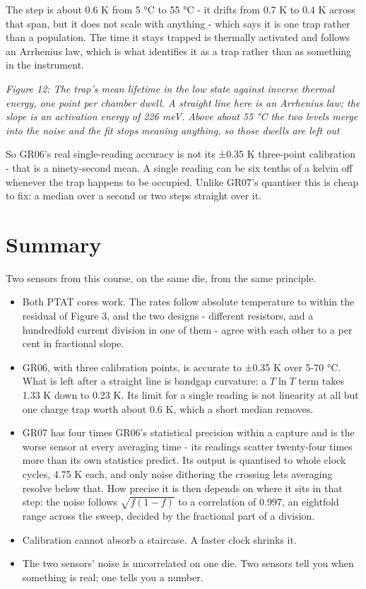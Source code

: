 The step is about 0.6 K from 5 °C to 55 °C - it drifts from 0.7 K to 0.4
K across that span, but it does not scale with anything - which says it
is one trap rather than a population. The time it stays trapped is
thermally activated and follows an Arrhenius law, which is what
identifies it as a trap rather than as something in the instrument.


{
\centering
{}
}

\emph{Figure 12: The trap's mean lifetime in the low state against
inverse thermal energy, one point per chamber dwell. A straight line
here is an Arrhenius law; the slope is an activation energy of 226 meV.
Above about 55 °C the two levels merge into the noise and the fit stops
meaning anything, so those dwells are left out}

So GR06's real single-reading accuracy is not its ±0.35 K three-point
calibration - that is a ninety-second mean. A single reading can be six
tenths of a kelvin off whenever the trap happens to be occupied. Unlike
GR07's quantiser this is cheap to fix: a median over a second or two
steps straight over it.

\section{Summary}\label{summary}

Two sensors from this course, on the same die, from the same principle.

\begin{itemize}
\tightlist
\item
  Both PTAT cores work. The rates follow absolute temperature to within
  the residual of Figure 3, and the two designs - different resistors,
  and a hundredfold current division in one of them - agree with each
  other to a per cent in fractional slope.
\item
  GR06, with three calibration points, is accurate to ±0.35 K over 5-70
  °C. What is left after a straight line is bandgap curvature: a
  \(T\ln T\) term takes 1.33 K down to 0.23 K. Its limit for a single
  reading is not linearity at all but one charge trap worth about 0.6 K,
  which a short median removes.
\item
  GR07 has four times GR06's statistical precision within a capture and
  is the worse sensor at every averaging time - its readings scatter
  twenty-four times more than its own statistics predict. Its output is
  quantised to whole clock cycles, 4.75 K each, and only noise dithering
  the crossing lets averaging resolve below that. How precise it is then
  depends on where it sits in that step: the noise follows
  \(\sqrt{f(1-f)}\) to a correlation of 0.997, an eightfold range across
  the sweep, decided by the fractional part of a division.
\item
  Calibration cannot absorb a staircase. A faster clock shrinks it.
\item
  The two sensors' noise is uncorrelated on one die. Two sensors tell
  you when something is real; one tells you a number.
\end{itemize}

